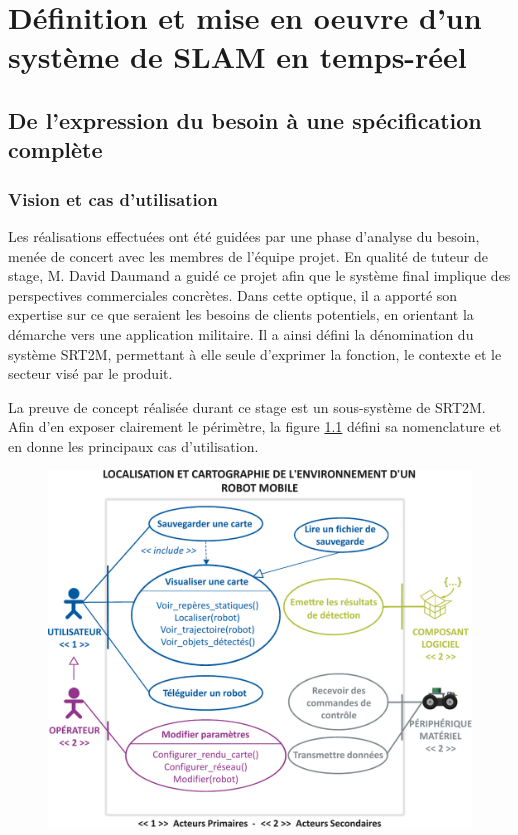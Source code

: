 \chapter{Définition et mise en oeuvre d'un système de SLAM en temps-réel}

\section{De l'expression du besoin à une spécification complète}

  \subsection{Vision et cas d'utilisation}

Les réalisations effectuées ont été guidées par une phase d'analyse du besoin, menée de concert avec les membres de l'équipe projet. 
En qualité de tuteur de stage, M. David Daumand a guidé ce projet afin que le système final implique des perspectives commerciales concrètes. 
Dans cette optique, il a apporté son expertise sur ce que seraient les besoins de clients potentiels, en orientant la démarche vers une application militaire. 
Il a ainsi défini la dénomination du système \gls{SRT2M}, permettant à elle seule d'exprimer la fonction, le contexte et le secteur visé par le produit.  

La preuve de concept réalisée durant ce stage est un sous-système de \gls{SRT2M}. 
Afin d'en exposer clairement le périmètre, la figure \ref{fig:use-case} défini sa nomenclature et en donne les principaux cas d'utilisation. 

\begin{figure}[h]
  \centering
    \includegraphics[width=.8\linewidth]{figures/use-case}  
  \label{fig:use-case}
\end{figure}

